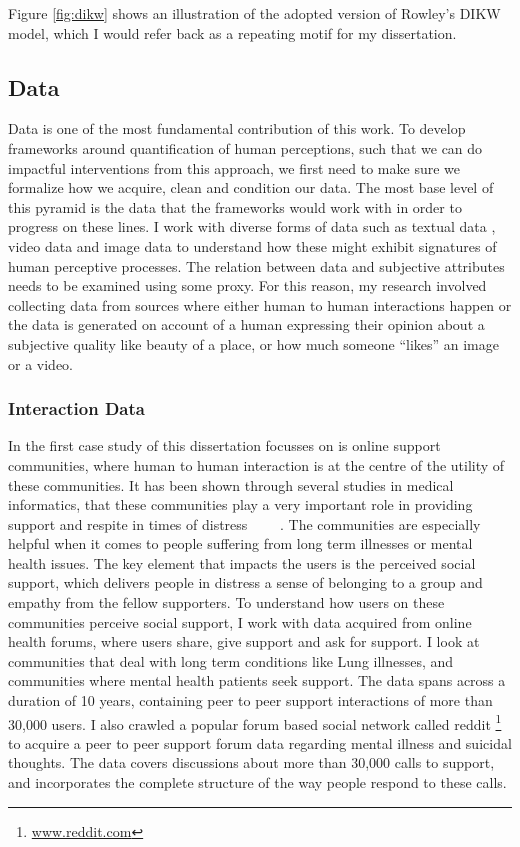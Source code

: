 Figure \ref{fig:dikw} shows an illustration of the adopted version of Rowley's DIKW model, which I would refer back as a repeating motif for my dissertation.

\subsection{Data}
Data is one of the most fundamental contribution of this work. To develop frameworks around quantification of human perceptions, such that we can do impactful interventions from this approach, we first need to make sure we formalize how we acquire, clean and condition our data. The most base level of this pyramid is the data that the frameworks would work with in order to progress on these lines. I work with diverse forms of data such as textual data , video data and image data to understand how these might exhibit signatures of human perceptive processes. The relation between data and subjective attributes needs to be examined using some proxy. For this reason, my research involved collecting data from sources where either human to human interactions happen or the data is generated on account of a human expressing their opinion about a subjective quality like beauty of a place, or how much someone ``likes'' an image or a video.

\subsubsection{Interaction Data}
In the first case study of this dissertation focusses on is online support communities, where human to human interaction is at the centre of the utility of these communities. It has been shown through several studies in medical informatics, that these communities play a very important role in providing support and respite in times of distress~\cite{allen2016long}~\cite{mo2012developing,pendry2015individual} ~\cite{bartlett2011investigation,izuka2017stroke}~\cite{hobbs2016online}. The communities are especially helpful when it comes to people suffering from long term illnesses or mental health issues.
The key element that impacts the users is the perceived social support\cite{nambisan2011information}, which delivers people in distress a sense of belonging to a group and empathy from the fellow supporters. 
To understand how users on these communities perceive social support, I work with data acquired from online health forums, where users share, give support and ask for support. I look at communities that deal with long term conditions like Lung illnesses, and communities where mental health patients seek support\cite{joglekar2018online}. The data spans across a duration of 10 years, containing peer to peer support interactions of more than 30,000 users. I also crawled a popular forum based social network called reddit \footnote{\url{www.reddit.com}} to acquire a peer to peer support forum data regarding mental illness and suicidal thoughts. The data covers discussions about more than 30,000 calls to support, and incorporates the complete structure of the way people respond to these calls. 

